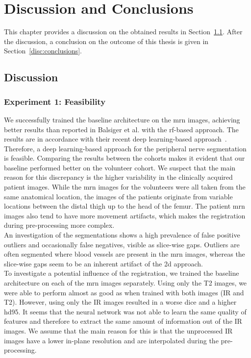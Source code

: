 \chapter{Discussion and Conclusions} \label{chap:discussion_and_conclusions}
This chapter provides a discussion on the obtained results in Section~\ref{disc:discussion}. After the discussion, a conclusion on the outcome of this thesis is given in Section~\ref{disc:conclusions}.

\section{Discussion} \label{disc:discussion}
\subsection{Experiment 1: Feasibility}
We successfully trained the baseline architecture on the \gls{mrn} images, achieving better results than reported in Balsiger et al. \cite{Balsiger2016DevelopmentApproaches} with the \gls{rf}-based approach. The results are in accordance with their recent deep learning-based approach~\cite{Balsiger2018SegmentationApproach}. Therefore, a deep learning-based approach for the peripheral nerve segmentation is feasible.
Comparing the results between the cohorts makes it evident that our baseline performed better on the volunteer cohort. We suspect that the main reason for this discrepancy is the higher variability in the clinically acquired patient images. While the \gls{mrn} images for the volunteers were all taken from the same anatomical location, the images of the patients originate from variable locations between the distal thigh up to the head of the femur. The patient \gls{mrn} images also tend to have more movement artifacts, which makes the registration during pre-processing more complex.\\
An investigation of the segmentations shows a high prevalence of false positive outliers and occasionally false negatives, visible as slice-wise gaps. Outliers are often segmented where blood vessels are present in the \gls{mrn} images, whereas the slice-wise gaps seem to be an inherent artifact of the \gls{2d} approach.\\
To investigate a potential influence of the registration, we trained the baseline architecture on each of the \gls{mrn} images separately. Using only the T2 images, we were able to perform almost as good as when trained with both images (IR and T2). However, using only the IR images resulted in a worse \acrlong{dice} and a higher \acrlong{hd95}. It seems that the neural network was not able to learn the same quality of features and therefore to extract the same amount of information out of the IR images. We assume that the main reason for this is that the unprocessed IR images have a lower in-plane resolution and are interpolated during the pre-processing.
